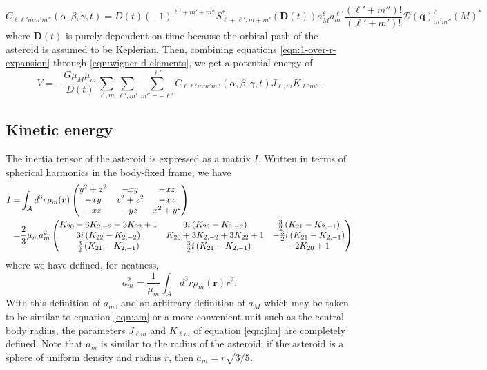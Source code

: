 \documentclass[11pt]{article}
\begin{document}
\begin{equation}
C_{\ell \ell' m m' m''}(\alpha, \beta, \gamma, t) = D(t)(-1)^{\ell'+m'+m''} S^*_{\ell+\ell', m + m'} (\bm D (t)) a_M^\ell a_m^{\ell'} \frac{(\ell' + m'')!}{(\ell' + m')!} \mathcal{D}(\bm q)^\ell_{m'm''}(M)^*
\label{eqn:c}
\end{equation}
where $\bm D(t)$ is purely dependent on time because the orbital path of the asteroid is assumed to be Keplerian. Then, combining equations \ref{eqn:1-over-r-expansion} through \ref{eqn:wigner-d-elements}, we get a potential energy of
\begin{equation}
V = -\frac{G \mu_M \mu_m}{D(t)}\sum_{\ell, m}\sum_{\ell', m'} \sum_{m''=-\ell'}^{\ell'} C_{\ell \ell' m m' m''}(\alpha, \beta, \gamma, t) J_{\ell, m} K_{\ell' m''}.
\label{eqn:pe}
\end{equation}

\subsection{Kinetic energy}
The inertia tensor of the asteroid is expressed as a matrix $I$. Written in terms of spherical harmonics in the body-fixed frame, we have
\begin{equation}
\begin{aligned}
I = &\int_\mathcal{A} d^3 r\rho_m(\bm r) \left( \begin{matrix}
y^2 + z^2 & -xy & -xz \\
-xy & x^2 + z^2 & -xz \\
-xz & -yz & x^2 + y^2 \\
\end{matrix} \right)\\
= &\frac{2}{3}\mu_m a_m^2\left( \begin{matrix}
K_{20}-3K_{2,-2}-3K_{22}+1 & 3i \left( K_{22}-K_{2,-2} \right) & \frac{3}{2}\left( K_{21}-K_{2,-1} \right)\\
3i \left( K_{22}-K_{2,-2} \right) & K_{20}+3K_{2,-2}+3K_{22}+1 & -\frac{3}{2}i\left( K_{21}-K_{2,-1} \right)\\
\frac{3}{2}\left( K_{21}-K_{2,-1} \right) & -\frac{3}{2}i\left( K_{21}-K_{2,-1} \right) & -2K_{20}+1\\
\end{matrix} \right)
\end{aligned}
\label{eqn:moi}
\end{equation}
where we have defined, for neatness,
\begin{equation}
a_m^2=\frac{1}{\mu_m}\int_\mathcal{A} d^3 r \rho_m(\bm r) r^2.
\label{eqn:am}
\end{equation}
With this definition of $a_m$, and an arbitrary definition of $a_M$ which may be taken to be similar to equation \ref{eqn:am} or a more convenient unit such as the central body radius, the parameters $J_{\ell m}$ and $K_{\ell m}$ of equation \ref{eqn:jlm} are completely defined. Note that $a_m$ is similar to the radius of the asteroid; if the asteroid is a sphere of uniform density and radius $r$, then $a_m = r\sqrt{3/5}$.
\end{document}
